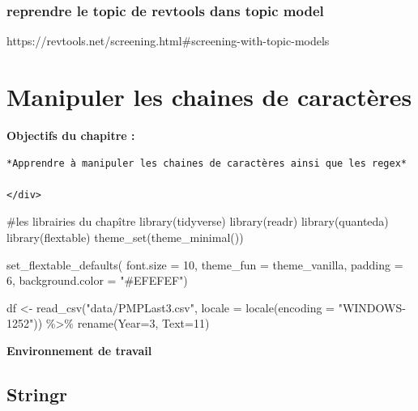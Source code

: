 \documentclass[
  letterpaper,
  DIV=11,
  numbers=noendperiod]{scrreprt}
\newenvironment{Shaded}{\begin{snugshade}}{\end{snugshade}}
\newcommand{\AttributeTok}[1]{\textcolor[rgb]{0.40,0.45,0.13}{#1}}
\newcommand{\CommentTok}[1]{\textcolor[rgb]{0.37,0.37,0.37}{#1}}
\newcommand{\DecValTok}[1]{\textcolor[rgb]{0.68,0.00,0.00}{#1}}
\newcommand{\FunctionTok}[1]{\textcolor[rgb]{0.28,0.35,0.67}{#1}}
\newcommand{\NormalTok}[1]{\textcolor[rgb]{0.00,0.23,0.31}{#1}}
\newcommand{\OtherTok}[1]{\textcolor[rgb]{0.00,0.23,0.31}{#1}}
\newcommand{\SpecialCharTok}[1]{\textcolor[rgb]{0.37,0.37,0.37}{#1}}
\newcommand{\StringTok}[1]{\textcolor[rgb]{0.13,0.47,0.30}{#1}}
\begin{document}
\subsection{reprendre le topic de revtools dans topic
model}\label{reprendre-le-topic-de-revtools-dans-topic-model}

https://revtools.net/screening.html\#screening-with-topic-models


\chapter{Manipuler les chaines de
caractères}\label{manipuler-les-chaines-de-caractuxe8res}

\textbf{Objectifs du chapitre :}

\begin{verbatim}
*Apprendre à manipuler les chaines de caractères ainsi que les regex*

</div>
\end{verbatim}

\begin{Shaded}
\begin{Highlighting}[]
\CommentTok{\#les librairies du chapître}
\FunctionTok{library}\NormalTok{(tidyverse)}
\FunctionTok{library}\NormalTok{(readr)}
\FunctionTok{library}\NormalTok{(quanteda)}
\FunctionTok{library}\NormalTok{(flextable)}
\FunctionTok{theme\_set}\NormalTok{(}\FunctionTok{theme\_minimal}\NormalTok{()) }

\FunctionTok{set\_flextable\_defaults}\NormalTok{(}
  \AttributeTok{font.size =} \DecValTok{10}\NormalTok{, }\AttributeTok{theme\_fun =}\NormalTok{ theme\_vanilla,}
  \AttributeTok{padding =} \DecValTok{6}\NormalTok{,}
  \AttributeTok{background.color =} \StringTok{"\#EFEFEF"}\NormalTok{)}


\NormalTok{df }\OtherTok{\textless{}{-}} \FunctionTok{read\_csv}\NormalTok{(}\StringTok{"data/PMPLast3.csv"}\NormalTok{, }
    \AttributeTok{locale =} \FunctionTok{locale}\NormalTok{(}\AttributeTok{encoding =} \StringTok{"WINDOWS{-}1252"}\NormalTok{)) }\SpecialCharTok{\%\textgreater{}\%}
  \FunctionTok{rename}\NormalTok{(}\AttributeTok{Year=}\DecValTok{3}\NormalTok{, }\AttributeTok{Text=}\DecValTok{11}\NormalTok{)}
\end{Highlighting}
\end{Shaded}

\textbf{Environnement de travail}

\section{Stringr}\label{stringr}
\end{document}
